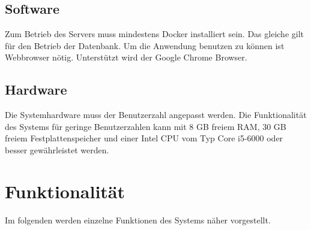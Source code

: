 \documentclass[a4paper]{scrreprt}
\begin{document}
\subsection{Software}
Zum Betrieb des Servers muss mindestens Docker installiert sein.
Das gleiche gilt für den Betrieb der Datenbank.
Um die Anwendung benutzen zu können ist Webbrowser nötig.
Unterstützt wird der Google Chrome Browser.
 
\subsection{Hardware}
Die Systemhardware muss der Benutzerzahl angepasst werden.
Die Funktionalität des Systems für geringe Benutzerzahlen kann mit 8 GB freiem RAM, 30 GB freiem Festplattenspeicher und einer Intel CPU vom Typ Core i5-6000 oder besser gewährleistet werden.
 

\section{Funktionalität}
Im folgenden werden einzelne Funktionen des Systems näher vorgestellt. 
 
\end{document}
